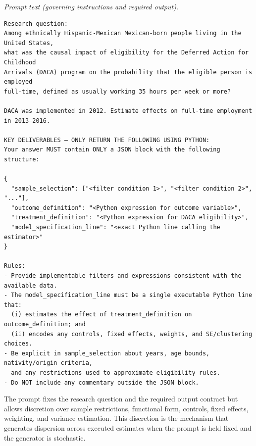 \documentclass[12pt]{article}
\begin{document}
\noindent\textit{Prompt text (governing instructions and required output).}
\begin{Verbatim}[fontsize=\small]
Research question:
Among ethnically Hispanic-Mexican Mexican-born people living in the United States,
what was the causal impact of eligibility for the Deferred Action for Childhood
Arrivals (DACA) program on the probability that the eligible person is employed
full-time, defined as usually working 35 hours per week or more?

DACA was implemented in 2012. Estimate effects on full-time employment in 2013–2016.

KEY DELIVERABLES — ONLY RETURN THE FOLLOWING USING PYTHON:
Your answer MUST contain ONLY a JSON block with the following structure:

{
  "sample_selection": ["<filter condition 1>", "<filter condition 2>", "..."],
  "outcome_definition": "<Python expression for outcome variable>",
  "treatment_definition": "<Python expression for DACA eligibility>",
  "model_specification_line": "<exact Python line calling the estimator>"
}

Rules:
- Provide implementable filters and expressions consistent with the available data.
- The model_specification_line must be a single executable Python line that:
  (i) estimates the effect of treatment_definition on outcome_definition; and
  (ii) encodes any controls, fixed effects, weights, and SE/clustering choices.
- Be explicit in sample_selection about years, age bounds, nativity/origin criteria,
  and any restrictions used to approximate eligibility rules.
- Do NOT include any commentary outside the JSON block.
\end{Verbatim}

The prompt fixes the research question and the required output contract but allows discretion over sample restrictions, functional form, controls, fixed effects, weighting, and variance estimation. This discretion is the mechanism that generates dispersion across executed estimates when the prompt is held fixed and the generator is stochastic.
\end{document}
